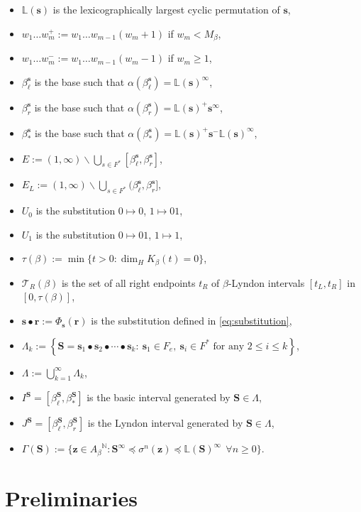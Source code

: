 \documentclass[11pt]{amsart}
\theoremstyle{definition}
\theoremstyle{remark}
\numberwithin{equation}{section}
\newcommand{\N}{\ensuremath{\mathbb{N}}}
\renewcommand{\L}{\ensuremath{\mathbb{L}}}
\newcommand{\F}{F^*}
\newcommand{\s}{ {\mathbf{s}}}
\newcommand{\cs}{ {\mathbf{S}}}
\renewcommand{\r}{ {\mathbf{r}}}
\newcommand{\z}{\mathbf{z}}
\newcommand{\set}[1]{\left\{#1\right\}}
\newcommand{\Ga}{\Gamma}
\newcommand{\f}{\infty}
\newcommand{\lle}{\preccurlyeq}
\newcommand{\La}{\Lambda}
\begin{document}
\begin{itemize}
\item $\L(\s)$ is the lexicographically largest cyclic permutation of $\s$,
\item $w_1\dots w_m^+:=w_1\dots w_{m-1}(w_m+1)$ if {$w_m<M_\beta$},
\item $w_1\dots w_m^-:=w_1\dots w_{m-1}(w_m-1)$ if {$w_m\geq 1$},
\item $\beta_\ell^{\s}$ is the base such that $\alpha(\beta_\ell^{\s})=\L(\s)^\f$,
\item $\beta_r^{\s}$ is the base such that $\alpha(\beta_r^{\s})=\L(\s)^+\s^\f$,
\item $\beta_*^{\s}$ is the base such that $\alpha(\beta_*^{\s})=\L(\s)^+\s^-\L(\s)^\f$,
\item $E:={(1,\f)}\backslash \bigcup_{s\in\F} [\beta_\ell^{\s},\beta_r^{\s}]$,
\item $E_L:={(1,\f)}\backslash \bigcup_{s\in\F} (\beta_\ell^{\s},\beta_r^{\s}]$,
\item $U_0$ is the substitution $0\mapsto 0$, $1\mapsto 01$,
\item $U_1$ is the substitution $0\mapsto 01$, $1\mapsto 1$,
\item $\tau(\beta):=\min\{t>0: \dim_H K_\beta(t)=0\}$,
\item $\mathcal{T}_R(\beta)$ is the set of all right endpoints $t_R$ of $\beta$-Lyndon intervals $[t_L,t_R]$ in $[0,\tau(\beta)]$,
\item $\s\bullet\r:=\Phi_\s(\r)$ is the substitution defined in \eqref{eq:substitution},
\item $\La_k:=\set{\cs=\s_1\bullet\s_2\bullet\cdots\bullet\s_k:\ {\s_1\in F_e, \ \s_i\in\F\textrm{ for any }2\le i\le k}}$,
\item $\La:=\bigcup_{k=1}^\f \La_k$,
\item $I^\cs=[\beta_\ell^\cs,\beta_*^\cs]$ is the basic interval generated by $\cs\in\La$,
\item $J^\cs=[\beta_\ell^{\cs},\beta_r^{\cs}]$ is the Lyndon interval generated by $\cs\in\La$,
\item $\Ga(\cs):=\{\z\in{A_\beta}^\N: \cs^\f\lle \sigma^n(\z)\lle \L(\cs)^\f\ \ \forall n\geq 0\}$.
\end{itemize}



\section{Preliminaries} \label{sec:prelim}
\end{document}
